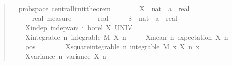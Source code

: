 \documentclass{svjour3}
\begin{document}
\begin{quote}
\begin{isabellebody}
\isamarkupfalse%
\ {\isacharparenleft}\ prob{\isacharunderscore}space{\isacharparenright}\ central{\isacharunderscore}limit{\isacharunderscore}theorem{\isacharcolon}\isanewline
\ \ \ \isanewline
\ \ \ \ X\ {\isacharcolon}{\isacharcolon}\ {\isachardoublequoteopen}nat\ {\isasymRightarrow}\ {\isacharprime}a\ {\isasymRightarrow}\ real{\isachardoublequoteclose}\ \isanewline
\ \ \ \ {\isasymmu}\ {\isacharcolon}{\isacharcolon}\ {\isachardoublequoteopen}real\ measure{\isachardoublequoteclose}\ \isanewline
\ \ \ \ {\isasymsigma}\ {\isacharcolon}{\isacharcolon}\ real\ \isanewline
\ \ \ \ S\ {\isacharcolon}{\isacharcolon}\ {\isachardoublequoteopen}nat\ {\isasymRightarrow}\ {\isacharprime}a\ {\isasymRightarrow}\ real{\isachardoublequoteclose}\isanewline
\ \ \isanewline
\ \ \ \ X{\isacharunderscore}indep{\isacharcolon}\ {\isachardoublequoteopen}indep{\isacharunderscore}vars\ {\isacharparenleft}{\isasymlambda}i{\isachardot}\ borel{\isacharparenright}\ X\ UNIV{\isachardoublequoteclose}\ \isanewline
\ \ \ \ X{\isacharunderscore}integrable{\isacharcolon}\ {\isachardoublequoteopen}{\isasymAnd}n{\isachardot}\ integrable\ M\ {\isacharparenleft}X\ n{\isacharparenright}{\isachardoublequoteclose}\ \isanewline
\ \ \ \ X{\isacharunderscore}mean{\isacharunderscore}{}{\isacharcolon}\ {\isachardoublequoteopen}{\isasymAnd}n{\isachardot}\ expectation\ {\isacharparenleft}X\ n{\isacharparenright}\ {\isacharequal}\ {}{\isachardoublequoteclose}\ \isanewline
\ \ \ \ {\isasymsigma}{\isacharunderscore}pos{\isacharcolon}\ {\isachardoublequoteopen}{\isasymsigma}\ {\isachargreater}\ {}{\isachardoublequoteclose}\ \isanewline
\ \ \ \ X{\isacharunderscore}square{\isacharunderscore}integrable{\isacharcolon}\ {\isachardoublequoteopen}{\isasymAnd}n{\isachardot}\ integrable\ M\ {\isacharparenleft}{\isasymlambda}x{\isachardot}\ {\isacharparenleft}X\ n\ x{\isacharparenright}\ \isanewline
\ \ \ \ X{\isacharunderscore}variance{\isacharcolon}\ {\isachardoublequoteopen}{\isasymAnd}n{\isachardot}\ variance\ {\isacharparenleft}X\ n{\isacharparenright}\ {\isacharequal}\ {\isasymsigma}\ \isanewline

\end{isabellebody}
\end{quote}
\end{document}
